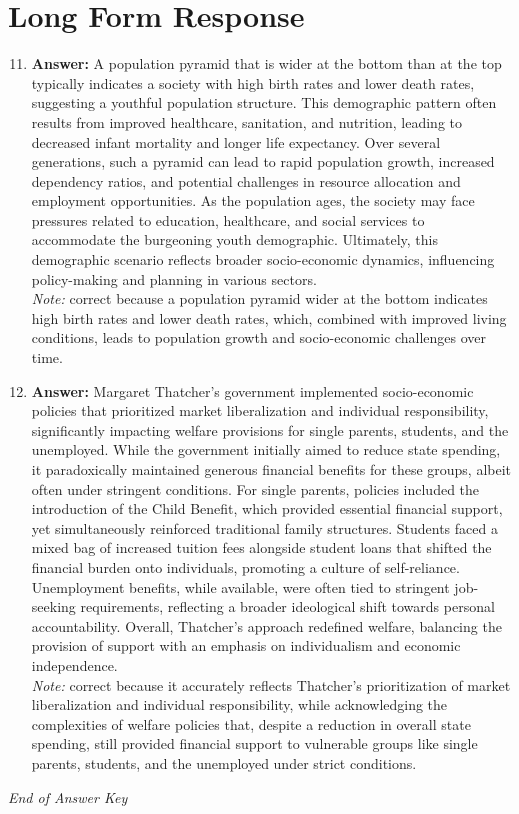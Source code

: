 \documentclass[12pt]{article}
\begin{document}
\section*{Long Form Response}
\begin{enumerate}[label=\arabic*.]
\setcounter{enumi}{10}
\item \textbf{Answer:} A population pyramid that is wider at the bottom than at the top typically indicates a society with high birth rates and lower death rates, suggesting a youthful population structure. This demographic pattern often results from improved healthcare, sanitation, and nutrition, leading to decreased infant mortality and longer life expectancy. Over several generations, such a pyramid can lead to rapid population growth, increased dependency ratios, and potential challenges in resource allocation and employment opportunities. As the population ages, the society may face pressures related to education, healthcare, and social services to accommodate the burgeoning youth demographic. Ultimately, this demographic scenario reflects broader socio-economic dynamics, influencing policy-making and planning in various sectors.
\\ \textit{Note:} correct because a population pyramid wider at the bottom indicates high birth rates and lower death rates, which, combined with improved living conditions, leads to population growth and socio-economic challenges over time.
\item \textbf{Answer:} Margaret Thatcher's government implemented socio-economic policies that prioritized market liberalization and individual responsibility, significantly impacting welfare provisions for single parents, students, and the unemployed. While the government initially aimed to reduce state spending, it paradoxically maintained generous financial benefits for these groups, albeit often under stringent conditions. For single parents, policies included the introduction of the Child Benefit, which provided essential financial support, yet simultaneously reinforced traditional family structures. Students faced a mixed bag of increased tuition fees alongside student loans that shifted the financial burden onto individuals, promoting a culture of self-reliance. Unemployment benefits, while available, were often tied to stringent job-seeking requirements, reflecting a broader ideological shift towards personal accountability. Overall, Thatcher's approach redefined welfare, balancing the provision of support with an emphasis on individualism and economic independence.
\\ \textit{Note:} correct because it accurately reflects Thatcher's prioritization of market liberalization and individual responsibility, while acknowledging the complexities of welfare policies that, despite a reduction in overall state spending, still provided financial support to vulnerable groups like single parents, students, and the unemployed under strict conditions.
\end{enumerate}

\vfill
\noindent\textit{End of Answer Key}
\end{document}
